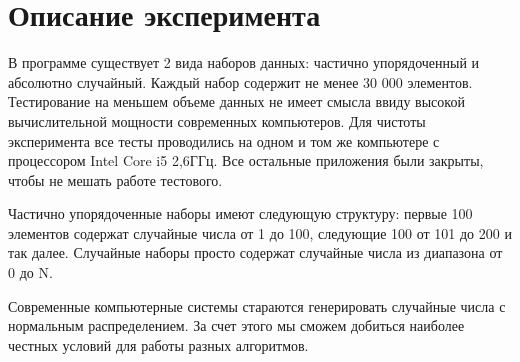 \section{Описание эксперимента}
В программе существует 2 вида наборов данных: частично упорядоченный
и абсолютно случайный. Каждый набор содержит не менее 30 000 элементов.
Тестирование на меньшем объеме данных не имеет смысла ввиду высокой
вычислительной мощности современных компьютеров. Для чистоты эксперимента
все тесты проводились на одном и том же компьютере с процессором Intel Core i5
2,6ГГц. Все остальные приложения были закрыты, чтобы не мешать работе тестового.\par
Частично упорядоченные наборы имеют следующую структуру: первые 100 элементов содержат
случайные числа от 1 до 100, следующие 100 от 101 до 200 и так далее. Случайные
наборы просто содержат случайные числа из диапазона от 0 до N.\par
Современные компьютерные системы стараются генерировать случайные числа с нормальным
распределением. За счет этого мы сможем добиться наиболее честных условий для работы
разных алгоритмов.